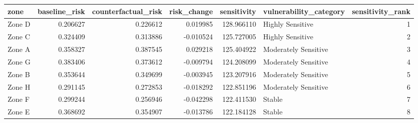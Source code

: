 \begin{tabular}{lrrrrlr}
\toprule
zone & baseline_risk & counterfactual_risk & risk_change & sensitivity & vulnerability_category & sensitivity_rank \\
\midrule
Zone D & 0.206627 & 0.226612 & 0.019985 & 128.966110 & Highly Sensitive & 1 \\
Zone C & 0.324409 & 0.313886 & -0.010524 & 125.727005 & Highly Sensitive & 2 \\
Zone A & 0.358327 & 0.387545 & 0.029218 & 125.404922 & Moderately Sensitive & 3 \\
Zone G & 0.383406 & 0.373612 & -0.009794 & 124.208099 & Moderately Sensitive & 4 \\
Zone B & 0.353644 & 0.349699 & -0.003945 & 123.207916 & Moderately Sensitive & 5 \\
Zone H & 0.291145 & 0.272853 & -0.018292 & 122.851196 & Moderately Sensitive & 6 \\
Zone F & 0.299244 & 0.256946 & -0.042298 & 122.411530 & Stable & 7 \\
Zone E & 0.368692 & 0.354907 & -0.013786 & 122.184128 & Stable & 8 \\
\bottomrule
\end{tabular}
